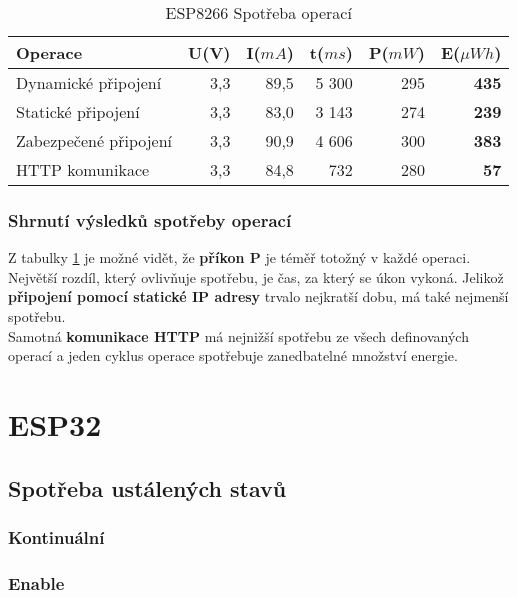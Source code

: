 \documentclass[a4paper, 12pt]{report}
\begin{document}
				\begin{table}[h]
					\centering
					\caption{ESP8266 Spotřeba operací}
					\begin{tabular}{||l| r r r r |r||}
						\hline
						Operace & U(V) & I($mA$) & t($ms$) & P($mW$) & \textbf{E}($\mu Wh$)\\
						\hline
						\hline
					Dynamické připojení & 3,3 & 89,5 & 5 300 & 295 & \textbf{435}\\
					Statické připojení & 3,3 & 83,0 & 3 143 & 274 & \textbf{239}\\
					Zabezpečené připojení & 3,3 & 90,9 & 4 606 & 300 & \textbf{383}\\
					HTTP komunikace & 3,3 & 84,8 & 732 & 280 & \textbf{57}\\
					\hline
					\end{tabular}
					\label{Spotreba_operaci}
				\end{table}

				\subsubsection{Shrnutí výsledků spotřeby operací}
					Z tabulky \ref{Spotreba_operaci} je možné vidět, že {\bf příkon P} je téměř totožný v každé operaci. Největší rozdíl, který ovlivňuje spotřebu, je čas, za který se úkon vykoná. Jelikož {\bf připojení pomocí statické IP adresy} trvalo nejkratší dobu, má také nejmenší spotřebu.\\
					Samotná {\bf komunikace HTTP} má nejnižší spotřebu ze všech definovaných operací a jeden cyklus operace spotřebuje zanedbatelné množství energie.


		\section{ESP32}

			\subsection{Spotřeba ustálených stavů}

				\subsubsection{Kontinuální}

				\subsubsection{Enable}
\end{document}
